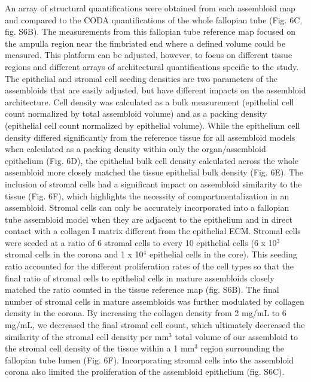\begin{refsection}
    An array of structural quantifications were obtained from each assembloid map and compared to the CODA quantifications of the whole fallopian tube (Fig. 6C, fig. S6B). The measurements from this fallopian tube reference map focused on the ampulla region near the fimbriated end where a defined volume could be measured. This platform can be adjusted, however, to focus on different tissue regions and different arrays of architectural quantifications specific to the study. The epithelial and stromal cell seeding densities are two parameters of the assembloids that are easily adjusted, but have different impacts on the assembloid architecture. Cell density was calculated as a bulk measurement (epithelial cell count normalized by total assembloid volume) and as a packing density (epithelial cell count normalized by epithelial volume). While the epithelium cell density differed significantly from the reference tissue for all assembloid models when calculated as a packing density within only the organ/assembloid epithelium (Fig. 6D), the epithelial bulk cell density calculated across the whole assembloid more closely matched the tissue epithelial bulk density (Fig. 6E). 
    The inclusion of stromal cells had a significant impact on assembloid similarity to the tissue (Fig. 6F), which highlights the necessity of compartmentalization in an assembloid. Stromal cells can only be accurately incorporated into a fallopian tube assembloid model when they are adjacent to the epithelium and in direct contact with a collagen I matrix different from the epithelial ECM\cite{lengyel2022a}. Stromal cells were seeded at a ratio of 6 stromal cells to every 10 epithelial cells (6 x 10$^3$ stromal cells in the corona and 1 x 10$^4$ epithelial cells in the core). This seeding ratio accounted for the different proliferation rates of the cell types so that the final ratio of stromal cells to epithelial cells in mature assembloids closely matched the ratio counted in the tissue reference map (fig. S6B). The final number of stromal cells in mature assembloids was further modulated by collagen density in the corona. By increasing the collagen density from 2 mg/mL to 6 mg/mL, we decreased the final stromal cell count, which ultimately decreased the similarity of the stromal cell density per mm$^3$ total volume of our assembloid to the stromal cell density of the tissue within a 1 mm$^3$ region surrounding the fallopian tube lumen (Fig. 6F). Incorporating stromal cells into the assembloid corona also limited the proliferation of the assembloid epithelium (fig. S6C). 

\end{refsection}
